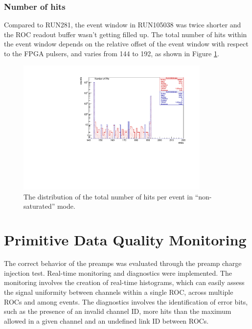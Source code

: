 \subsubsection{Number of hits}
Compared to RUN281, the event window in RUN105038 was twice shorter
and the ROC readout buffer wasn't getting filled up.
The total number of hits within the event window depends on the relative offset
of the event window with respect to the FPGA pulsers, and varies from
144 to 192, as shown in Figure \ref{fig:6}.

\begin{figure}[!h]
\centering
\includegraphics[width =0.85\textwidth]{figures/pdf/figure_00009_nhits_105038.pdf}
\caption{
  The distribution of the total number of hits per event in ``non-saturated'' mode.
}
\label{fig:6}
\end{figure}
\section{Primitive Data Quality Monitoring}\label{dqm}
The correct behavior of the preamps was evaluated through the preamp charge injection test. Real-time monitoring and diagnostics were implemented.
The monitoring involves the creation of real-time histograms, which can easily assess 
the signal uniformity between channels within a single ROC, across multiple ROCs and among events.
The diagnostics involves the identification of error bits, such as the presence of an 
invalid channel ID, more hits than the maximum allowed in a given channel and an undefined link ID between ROCs.

